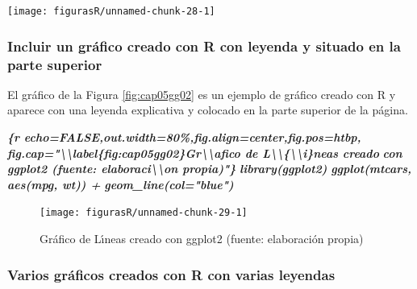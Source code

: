 \documentclass[12pt,a4paper,oneside,]{book}
\newenvironment{Shaded}{\begin{snugshade}}{\end{snugshade}}
\newcommand{\InformationTok}[1]{\textcolor[rgb]{0.56,0.35,0.01}{\textbf{\textit{#1}}}}
\numberwithin{dummy}{section}
\theoremstyle{ocrenumbox}
\theoremstyle{blacknumex}
\theoremstyle{blacknumbox}
\theoremstyle{ocrenum}
\theoremstyle{ocrenum}
\begin{document}
\begin{center}\texttt{[image: figurasR/unnamed-chunk-28-1]} \end{center}

\hypertarget{incluir-un-gruxe1fico-creado-con-r-con-leyenda-y-situado-en-la-parte-superior}{%
\subsubsection{Incluir un gráfico creado con R con leyenda y situado en
la parte
superior}\label{incluir-un-gruxe1fico-creado-con-r-con-leyenda-y-situado-en-la-parte-superior}}

El gráfico de la Figura \ref{fig:cap05gg02} es un ejemplo de gráfico
creado con R y aparece con una leyenda explicativa y colocado en la
parte superior de la página.

\begin{Shaded}
\begin{Highlighting}[]
\InformationTok{\textasciigrave{}\textasciigrave{}\textasciigrave{}\{r echo=FALSE,out.width=\textquotesingle{}80\%\textquotesingle{},fig.align=\textquotesingle{}center\textquotesingle{},fig.pos=\textquotesingle{}htbp\textquotesingle{},}
\InformationTok{fig.cap="\textbackslash{}\textbackslash{}label\{fig:cap05gg02\}Gr\textbackslash{}\textbackslash{}\textquotesingle{}afico de L\textbackslash{}\textbackslash{}\textquotesingle{}\{\textbackslash{}\textbackslash{}i\}neas creado }
\InformationTok{         con ggplot2 (fuente: elaboraci\textbackslash{}\textbackslash{}\textquotesingle{}on propia)"\}}
\InformationTok{library(ggplot2)}
\InformationTok{ggplot(mtcars, aes(mpg, wt)) + }
\InformationTok{  geom\_line(col="blue")}
\InformationTok{\textasciigrave{}\textasciigrave{}\textasciigrave{}}
\end{Highlighting}
\end{Shaded}

\begin{figure}[htbp]

{\centering \texttt{[image: figurasR/unnamed-chunk-29-1]} 

}

\caption{\label{fig:cap05gg02}Gr\'afico de L\'{\i}neas creado con ggplot2 (fuente: elaboraci\'on propia)}\label{fig:unnamed-chunk-29}
\end{figure}

\hypertarget{varios-gruxe1ficos-creados-con-r-con-varias-leyendas}{%
\subsubsection{Varios gráficos creados con R con varias
leyendas}\label{varios-gruxe1ficos-creados-con-r-con-varias-leyendas}}
\end{document}
